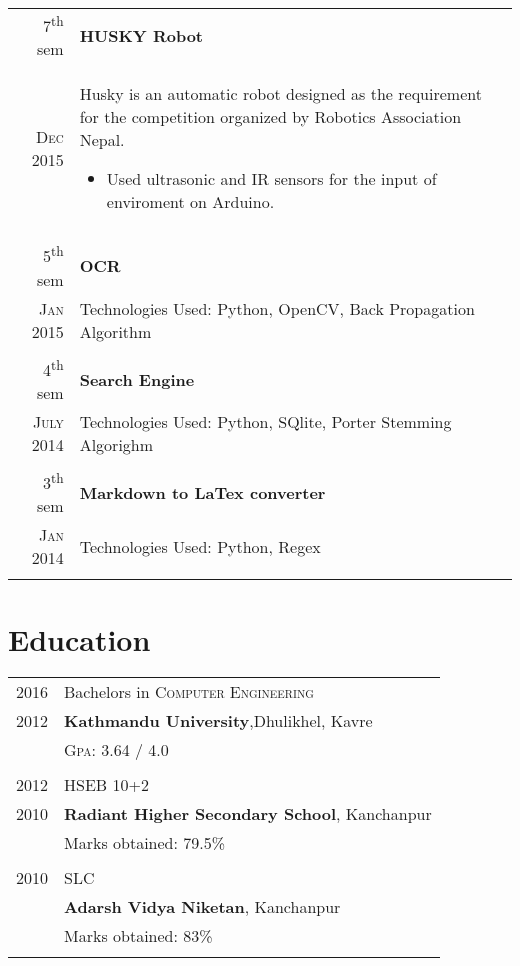 \documentclass[a4paper,10pt]{article}
\begin{document}
\begin{tabular}{r|p{11cm}}
7\textsuperscript{th} sem & \textbf{HUSKY Robot}\\ \textsc{Dec 2015} & \small{Husky is an automatic robot designed as the requirement for the competition organized by Robotics Association Nepal.
\footnotesize{
\begin{itemize}
\item Used ultrasonic and IR sensors for the input of enviroment on Arduino.
\end{itemize}
}}\\\multicolumn{2}{c}{} \\

5\textsuperscript{th} sem & \textbf{OCR}\\ \textsc{Jan 2015} & \small{{Technologies Used: Python, OpenCV, Back Propagation Algorithm}}\\\multicolumn{2}{c}{} \\

4\textsuperscript{th} sem & \textbf{Search Engine}\\ \textsc{July 2014} & \small{Technologies Used: Python, SQlite, Porter Stemming Algorighm}\\\multicolumn{2}{c}{} \\

3\textsuperscript{th} sem & \textbf{Markdown to LaTex converter}\\ \textsc{Jan 2014} & \small{Technologies Used: Python, Regex}\\\multicolumn{2}{c}{} \\
\end{tabular}


\section{Education}
\begin{tabular}{rl}	
2016  & Bachelors in \textsc{Computer Engineering}\\
2012 & \textbf{Kathmandu University},Dhulikhel, Kavre\\
& \normalsize \textsc{Gpa}: 3.64 / 4.0\\\\
2012 & HSEB 10+2 \\ 
2010 &\normalsize\textbf{Radiant Higher Secondary School}, Kanchanpur\\
&Marks obtained: 79.5\%\\&\\
2010& SLC\\ & \textbf{Adarsh Vidya Niketan}, Kanchanpur\\
&Marks obtained: 83\%\\&\\
\end{tabular}
\end{document}
